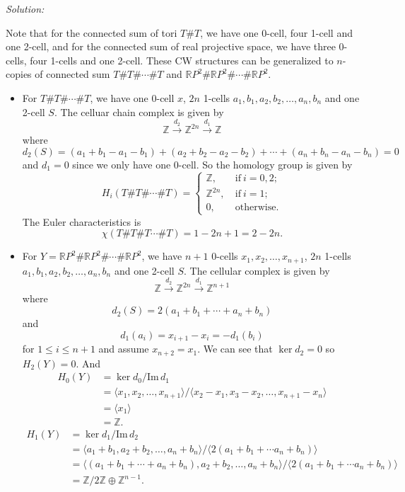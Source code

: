 \documentclass[a4paper, 12pt]{article}
\newenvironment{solution}
    {\textit{Solution:}}
    {}
\newcommand{\im}{\text{Im}\,}
\newcommand{\la}{\langle}
\newcommand{\ra}{\rangle}
\begin{document}
\begin{solution}
\begin{enumerate}[(1)]
Note that for the connected sum of tori \(T\#T\), we have one 0-cell, four 1-cell and one 2-cell, and for the connected sum of real projective space, we have three 0-cells, four 1-cells and one 2-cell. These CW structures can be generalized to \(n\)-copies of 
connected sum \(T\#T\#\cdots \#T\) and \(\mathbb{R}P^2\#\mathbb{R}P^2\#\cdots\#\mathbb{R}P^2\). 
\begin{itemize}
\item For \(T\#T\#\cdots\#T\), we have one 0-cell \(x\), \(2n\) 1-cells \(a_1,b_1,a_2,b_2,\ldots,a_n,b_n\) and one 2-cell \(S\). The celluar chain complex is given by 
\[\mathbb{Z}\xrightarrow{d_2}\mathbb{Z}^{2n}\xrightarrow{d_1} \mathbb{Z}\]
where 
\[d_2(S)=(a_1+b_1-a_1-b_1)+(a_2+b_2-a_2-b_2)+\cdots+(a_n+b_n-a_n-b_n)=0\]
and \(d_1=0\) since we only have one 0-cell. So the homology group is given by 
\[H_i(T\#T\#\cdots\#T)=\begin{cases}
    \mathbb{Z},&\ \text{if}\ i=0,2;\\
    \mathbb{Z}^{2n},&\ \text{if}\ i=1;\\ 
    0,&\ \text{otherwise}. 
\end{cases}\]
The Euler characteristics is 
\[\chi(T\#T\#T\cdots\# T)=1-2n+1=2-2n.\]
\item For \(Y=\mathbb{R}P^2\#\mathbb{R}P^2\#\cdots\#\mathbb{R}P^2\), we have \(n+1\) 0-cells \(x_1,x_2,\ldots,x_{n+1}\), \(2n\) 1-cells \(a_1,b_1,a_2,b_2,\ldots,a_n,b_n\) and one 2-cell \(S\). The cellular complex is given by 
\[\mathbb{Z}\xrightarrow{d_2}\mathbb{Z}^{2n}\xrightarrow{d_1}\mathbb{Z}^{n+1}\]
where 
\[d_2(S)=2(a_1+b_1+\cdots+a_n+b_n)\]
and 
\[d_1(a_i)=x_{i+1}-x_i=-d_1(b_i)\]
for \(1\leq i\leq n+1\) and assume \(x_{n+2}=x_1\). We can see that \(\ker d_2=0\) so \(H_2(Y)=0\). And 
\begin{align*}
    H_0(Y)&=\ker d_0/\im d_1\\ 
          &=\la x_1,x_2,\ldots,x_{n+1}\ra/\la x_2-x_1,x_3-x_2,\ldots,x_{n+1}-x_n\ra\\ 
          &=\la x_1\ra\\ 
          &=\mathbb{Z}. 
\end{align*}
\begin{align*}
    H_1(Y)&=\ker d_1/\im d_2\\ 
          &=\la a_1+b_1,a_2+b_2,\ldots,a_n+b_n\ra/\la 2(a_1+b_1+\cdots a_n+b_n)\ra\\ 
          &=\la (a_1+b_1+\cdots+a_n+b_n),a_2+b_2,\ldots,a_n+b_n\ra/\la 2(a_1+b_1+\cdots a_n+b_n)\ra\\ 
          &=\mathbb{Z}/2 \mathbb{Z}\oplus \mathbb{Z}^{n-1}.

\end{align*}
\end{itemize}
\end{enumerate}
\end{solution}
\end{document}
